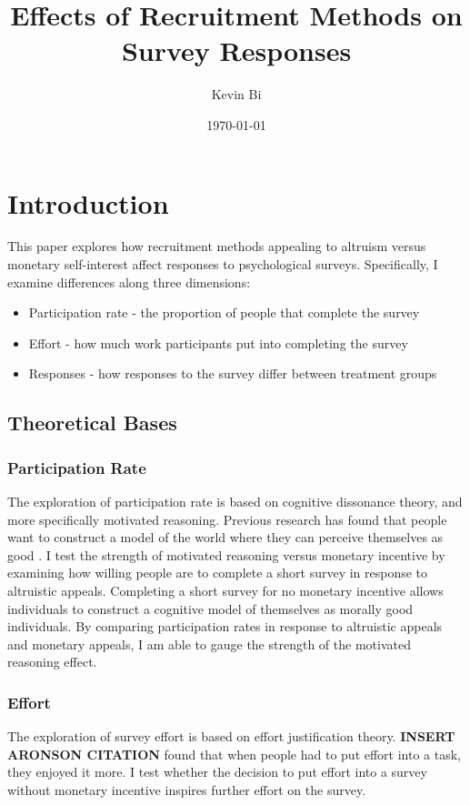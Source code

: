 \documentclass[12pt]{article}
\title{Effects of Recruitment Methods on Survey Responses}
\author{Kevin Bi}
\date{\today}
\begin{document}
\maketitle

\section{Introduction}

This paper explores how recruitment methods appealing to altruism versus monetary self-interest affect responses to psychological surveys. Specifically, I examine differences along three dimensions: 
\begin{itemize}
    \item Participation rate - the proportion of people that complete the survey 
    \item Effort - how much work participants put into completing the survey 
    \item Responses - how responses to the survey differ between treatment groups
\end{itemize}

\subsection{Theoretical Bases}
\subsubsection{Participation Rate}
The exploration of participation rate is based on cognitive dissonance theory, and more specifically motivated reasoning. Previous research has found that people want to construct a model of the world where they can perceive themselves as good \citep{batson}. I test the strength of motivated reasoning versus monetary incentive by examining how willing people are to complete a short survey in response to altruistic appeals. Completing a short survey for no monetary incentive allows individuals to construct a cognitive model of themselves as morally good individuals. By comparing participation rates in response to altruistic appeals and monetary appeals, I am able to gauge the strength of the motivated reasoning effect. 

\subsubsection{Effort}
The exploration of survey effort is based on effort justification theory. \textbf{INSERT ARONSON CITATION} found that when people had to put effort into a task, they enjoyed it more. I test whether the decision to put effort into a survey without monetary incentive inspires further effort on the survey. 
\end{document}
